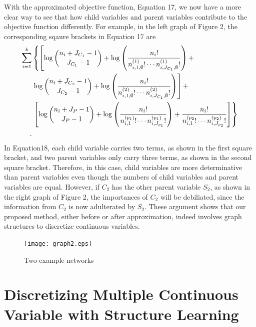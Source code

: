 With the approximated objective function, Equation 17, we now have a more clear way to see that how child variables and parent variables contribute to the objective function differently. For example, in the left graph of Figure 2, the corresponding sqaure brackets in Equation 17 are
\begin{equation}
\begin{aligned}
 \sum_{i=1}^k & \left\lbrace   \left[ \log{{n_{i} + J_{C_1} - 1}\choose{J_{C_1}-1}} + \log \left(  {{{n_i}!} \over { {n^{(1)}_{i,1,\emptyset} !} \cdots {n^{(1)}_{i,J_{C_1},\emptyset} !}} }  \right)  +  \right. \right.\\ 
& \left.  \log{{n_{i} + J_{C_2} - 1}\choose{J_{C_2}-1}} + \log \left(  {{{n_i}!} \over { {n^{(2)}_{i,1,\emptyset} !} \cdots {n^{(2)}_{i,J_{C_1},\emptyset} !}} }  \right)  \right] + \\
&  \left. \left[  \log {{n_{i} + J_P - 1}\choose{J_P-1}} +  \log \left( { {{{n}_i}!}\over{ {n^{(p_1)}_{i,1} !}\cdots {n^{(p_1)}_{i,J_{p_1}} !}}} \right) +{ {{{n}_i}!}\over{ {n^{(p_2}_{i,1} !}\cdots {n^{(p_2)}_{i,J_{p_2}} !}}}  \right] \right\rbrace\\ .
\end{aligned}
\end{equation}
In Equation18, each child variable carries two terms, as shown in the first square bracket, and two parent variables only carry three terms, as shown in the second square bracket. Therefore, in this case, child variables are more determinative than parent variables even though the numbers of child variables and parent variables are equal. However, if $C_2$ has the other parent variable $S_2$, as shown in the right graph of Figure 2, the importances of $C_2$ will be debiliated, since the information from $C_2$ is now adulterated by $S_2$. These argument shows that our proposed method, either before or after approximation, indeed involves graph structures to discretize continuous variables.


\begin{figure}
  \texttt{[image: graph2.eps]}
\caption{Two example networks}
\label{fig:2}       %
\end{figure}

\section{Discretizing Multiple Continuous Variable with Structure Learning}
\label{DMC_SL}

